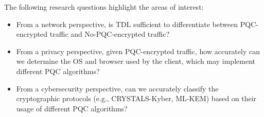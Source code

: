 \documentclass[10pt,journal]{IEEEtran}%
\begin{document}



The following research questions highlight the areas of interest:


\begin{itemize}
\item From a network perspective, is TDL sufficient to differentiate between PQC-encrypted traffic and No-PQC-encrypted traffic?
\item From a privacy perspective, given PQC-encrypted traffic, how accurately can we determine the OS and browser used by the client, which may implement different PQC algorithms? 
\item From a cybersecurity perspective, can we accurately classify the cryptographic protocols (e.g., CRYSTALS-Kyber, ML-KEM) based on their usage of different PQC algorithms?
\end{itemize}
\end{document}
